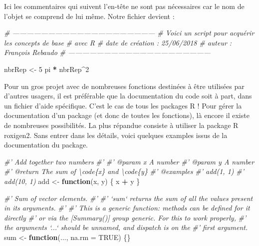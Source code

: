 \documentclass[]{book}
\newenvironment{Shaded}{\begin{snugshade}}{\end{snugshade}}
\newcommand{\CommentTok}[1]{\textcolor[rgb]{0.56,0.35,0.01}{\textit{#1}}}
\newcommand{\ControlFlowTok}[1]{\textcolor[rgb]{0.13,0.29,0.53}{\textbf{#1}}}
\newcommand{\DataTypeTok}[1]{\textcolor[rgb]{0.13,0.29,0.53}{#1}}
\newcommand{\DecValTok}[1]{\textcolor[rgb]{0.00,0.00,0.81}{#1}}
\newcommand{\NormalTok}[1]{#1}
\newcommand{\OperatorTok}[1]{\textcolor[rgb]{0.81,0.36,0.00}{\textbf{#1}}}
\newcommand{\OtherTok}[1]{\textcolor[rgb]{0.56,0.35,0.01}{#1}}
\newcommand{\StringTok}[1]{\textcolor[rgb]{0.31,0.60,0.02}{#1}}
\begin{document}
Ici les commentaires qui suivent l'en-tête ne sont pas nécessaires car le nom de l'objet se comprend de lui même. Notre fichier devient :

\begin{Shaded}
\begin{Highlighting}[]
\CommentTok{# ------------------------------------------------------------}
\CommentTok{# Voici un script pour acquérir les concepts de base }
\CommentTok{# avec R}
\CommentTok{# date de création : 25/06/2018}
\CommentTok{# auteur : François Rebaudo}
\CommentTok{# ------------------------------------------------------------}

\NormalTok{nbrRep <-}\StringTok{ }\DecValTok{5}
\NormalTok{pi }\OperatorTok{*}\StringTok{ }\NormalTok{nbrRep}\OperatorTok{^}\DecValTok{2}
\end{Highlighting}
\end{Shaded}

Pour un gros projet avec de nombreuses fonctions destinées à être utilisées par d'autres usagers, il est préférable que la documentation du code soit à part, dans un fichier d'aide spécifique. C'est le cas de tous les packages R ! Pour gérer la documentation d'un package (et donc de toutes les fonctions), là encore il existe de nombreuses possibilités. La plus répandue consiste à utiliser la package R roxigen2. Sans entrer dans les détails, voici quelques examples issus de la documentation du package.

\begin{Shaded}
\begin{Highlighting}[]
\CommentTok{#' Add together two numbers}
\CommentTok{#'}
\CommentTok{#' @param x A number}
\CommentTok{#' @param y A number}
\CommentTok{#' @return The sum of \textbackslash{}code\{x\} and \textbackslash{}code\{y\}}
\CommentTok{#' @examples}
\CommentTok{#' add(1, 1)}
\CommentTok{#' add(10, 1)}
\NormalTok{add <-}\StringTok{ }\ControlFlowTok{function}\NormalTok{(x, y) \{}
\NormalTok{  x }\OperatorTok{+}\StringTok{ }\NormalTok{y}
\NormalTok{\}}
\end{Highlighting}
\end{Shaded}

\begin{Shaded}
\begin{Highlighting}[]
\CommentTok{#' Sum of vector elements.}
\CommentTok{#'}
\CommentTok{#' `sum` returns the sum of all the values present in its arguments.}
\CommentTok{#'}
\CommentTok{#' This is a generic function: methods can be defined for it directly}
\CommentTok{#' or via the [Summary()] group generic. For this to work properly,}
\CommentTok{#' the arguments `...` should be unnamed, and dispatch is on the}
\CommentTok{#' first argument.}
\NormalTok{sum <-}\StringTok{ }\ControlFlowTok{function}\NormalTok{(..., }\DataTypeTok{na.rm =} \OtherTok{TRUE}\NormalTok{) \{\}}
\end{Highlighting}
\end{Shaded}
\end{document}
